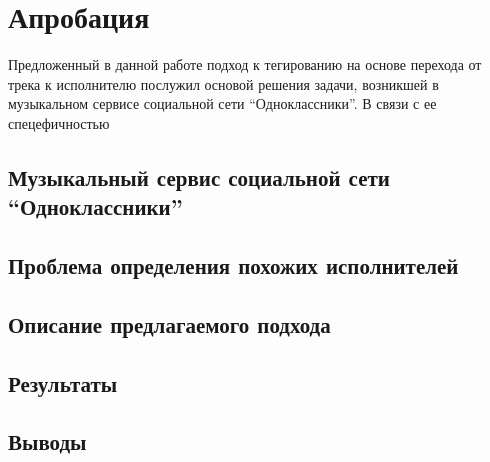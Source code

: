 \chapter{Апробация} 
\label{approbation}

Предложенный в данной работе подход к тегированию на основе перехода от трека к исполнителю послужил основой решения задачи, возникшей
в музыкальном сервисе социальной сети ``Одноклассники''. В связи с ее спецефичностью

\section{Музыкальный сервис социальной сети “Одноклассники”}
\section{Проблема определения похожих исполнителей}
\section{Описание предлагаемого подхода}
\section{Результаты}
\section{Выводы}